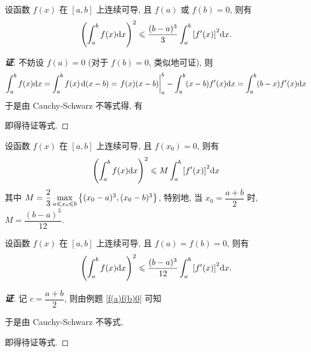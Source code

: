 \begin{example}
    \label{f(a)f(b)0}设函数 $f(x)$ 在 $[a,b]$ 上连续可导, 且 $f(a)$ 或 $f(b)=0$, 则有
    $$\qty(\int_{a}^{b}f(x)\dd x)^2\leqslant \dfrac{(b-a)^3}{3}\int_{a}^{b}\qty[f'(x)]^2 \dd x.$$
\end{example}
\begin{proof}[{\songti \textbf{证}}]
    不妨设 $f(a)=0$ (对于 $f(b)=0$, 类似地可证), 则
    $$\int_{a}^{b}f(x)\dd x=\int_{a}^{b}f(x)\dd (x-b)=\eval{f(x)(x-b)}_{a}^{b}-\int_{a}^{b}(x-b)f'(x)\dd x=\int_{a}^{b}(b-x)f'(x)\dd x$$
    于是由 Cauchy-Schwarz 不等式得, 有
    即得待证等式.
\end{proof}
\begin{inference}
    设函数 $f(x)$ 在 $[a,b]$ 上连续可导, 且 $f(x_0)=0$, 则有
    $$\qty(\int_{a}^{b}f(x)\dd x)^2\leqslant M\int_{a}^{b}\qty[f'(x)]^2 \dd x$$
    其中 $M=\dfrac{2}{3}\max\limits_{a\leqslant x_0\leqslant b}\qty{(x_0-a)^3,(x_0-b)^3}$, 特别地, 当 $x_0=\dfrac{a+b}{2}$ 时, $M=\dfrac{(b-a)^3}{12}.$
\end{inference}

\begin{example}
    设函数 $f(x)$ 在 $[a,b]$ 上连续可导, 且 $f(a)=f(b)=0$, 则有
    $$\qty(\int_{a}^{b}f(x)\dd x)^2\leqslant \dfrac{(b-a)^3}{12}\int_{a}^{b}\qty[f'(x)]^2 \dd x.$$
\end{example}
\begin{proof}[{\songti \textbf{证}}]
    记 $c=\dfrac{a+b}{2}$, 则由例题 \ref{f(a)f(b)0} 可知
    于是由 Cauchy-Schwarz 不等式,
    即得待证等式.
\end{proof}

